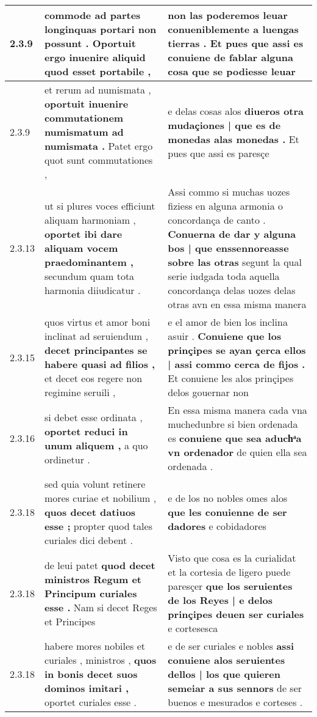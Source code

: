 \begin{tabular}{|p{1cm}|p{6.5cm}|p{6.5cm}|}
2.3.9 & commode ad partes longinquas portari non possunt . \textbf{ Oportuit ergo inuenire aliquid } quod esset portabile , & non las poderemos leuar conueniblemente a luengas tierras . \textbf{ Et pues que assi es conuiene de fablar alguna cosa } que se podiesse leuar \\\hline
2.3.9 & et rerum ad numismata , \textbf{ oportuit inuenire commutationem numismatum ad numismata . } Patet ergo quot sunt commutationes , & e delas cosas alos \textbf{ diueros otra mudaçiones | que es de monedas alas monedas . } Et pues que assi es paresçe \\\hline
2.3.13 & ut si plures voces efficiunt aliquam harmoniam , \textbf{ oportet ibi dare aliquam vocem praedominantem , } secundum quam tota harmonia diiudicatur . & Assi commo si muchas uozes fiziess en alguna armonia o concordança de canto . \textbf{ Conuerna de dar y alguna bos | que enssennoreasse sobre las otras } segunt la qual serie iudgada toda aquella concordança delas uozes delas otras avn en essa misma manera \\\hline
2.3.15 & quos virtus et amor boni inclinat ad seruiendum , \textbf{ decet principantes se habere quasi ad filios , } et decet eos regere non regimine seruili , & e el amor de bien los inclina asuir . \textbf{ Conuiene que los prinçipes se ayan çerca ellos | assi commo cerca de fijos . } Et conuiene les alos prinçipes delos gouernar non \\\hline
2.3.16 & si debet esse ordinata , \textbf{ oportet reduci in unum aliquem , } a quo ordinetur . & En essa misma manera cada vna muchedunbre si bien ordenada es \textbf{ conuiene que sea aduchͣa vn ordenador } de quien ella sea ordenada . \\\hline
2.3.18 & sed quia volunt retinere mores curiae et nobilium , \textbf{ quos decet datiuos esse ; } propter quod tales curiales dici debent . & e de los no nobles omes alos \textbf{ que les conuienne de ser dadores } e cobidadores \\\hline
2.3.18 & de leui patet \textbf{ quod decet ministros Regum et Principum curiales esse . } Nam si decet Reges et Principes & Visto que cosa es la curialidat et la cortesia de ligero puede paresçer \textbf{ que los seruientes de los Reyes | e delos prinçipes deuen ser curiales } e cortesesca \\\hline
2.3.18 & habere mores nobiles et curiales , ministros , \textbf{ quos in bonis decet suos dominos imitari , } oportet curiales esse . & e de ser curiales e nobles \textbf{ assi conuiene alos seruientes dellos | los que quieren semeiar a sus sennors } de ser buenos e mesurados e corteses . \\\hline

\end{tabular}
